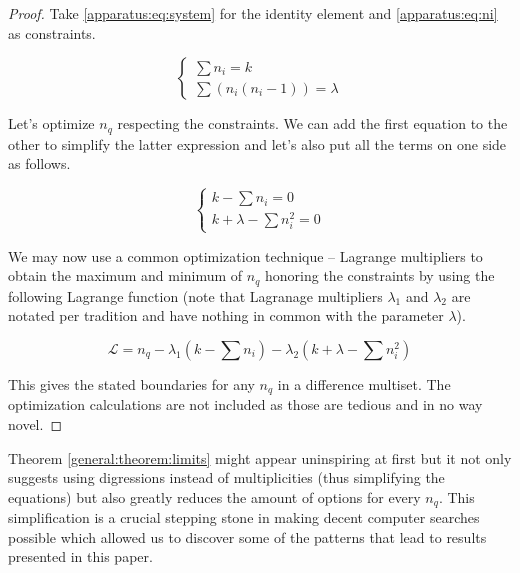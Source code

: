     \begin{proof}
        Take \eqref{apparatus:eq:system} for the identity element and \eqref{apparatus:eq:ni} as constraints.
        
        \begin{equation}
            \begin{cases}
                \sum {n_i} = k \\
                \sum (n_i(n_{i}-1)) = \lambda
            \end{cases}
        \end{equation}
        
        Let's optimize $n_q$ respecting the constraints. We can add the first equation to the other to simplify the latter expression and let's also put all the terms on one side as follows.
        
        \begin{equation}
            \begin{cases}
                k - \sum {n_i} = 0 \\
                k + \lambda - \sum n_i^2 = 0
            \end{cases}
        \end{equation}
        
        We may now use a common optimization technique -- Lagrange multipliers to obtain the maximum and minimum of $n_q$ honoring the constraints by using the following Lagrange function (note that Lagranage multipliers $\lambda_1$ and $\lambda_2$ are notated per tradition and have nothing in common with the parameter $\lambda$).
        
        \begin{equation}
            \mathcal L = n_q - \lambda_1 (k - \sum n_i) - \lambda_2 (k + \lambda - \sum n_i^2)
        \end{equation}
        
        This gives the stated boundaries for any $n_q$ in a difference multiset. The optimization calculations are not included as those are tedious and in no way novel.
    \end{proof}

    Theorem \ref{general:theorem:limits} might appear uninspiring at first but it not only suggests using digressions instead of multiplicities (thus simplifying the equations) but also greatly reduces the amount of options for every $n_q$. This simplification is a crucial stepping stone in making decent computer searches possible which allowed us to discover some of the patterns that lead to results presented in this paper.
        
